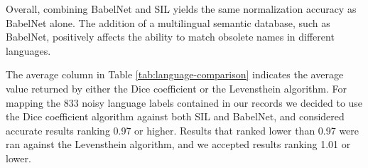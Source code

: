 \documentclass[11pt]{article}
\begin{document}
\begin{table}
    \caption{\label{tab:language-comparison}Accuracy of language mappings}
\end{table}

Overall, combining BabelNet and SIL yields the same normalization accuracy as BabelNet alone. The addition of a multilingual semantic database, such as BabelNet, positively affects the ability to match obsolete names in different languages. 


The average column in Table \ref{tab:language-comparison} indicates the average
value returned by either the Dice coefficient or the Levensthein algorithm. For
mapping the 833 noisy language labels contained in our records we decided to use the Dice coefficient algorithm against both SIL and BabelNet, and considered accurate results ranking 0.97 or higher. Results that ranked lower than 0.97 were ran against the Levensthein algorithm, and we accepted results ranking 1.01 or lower.
\end{document}
